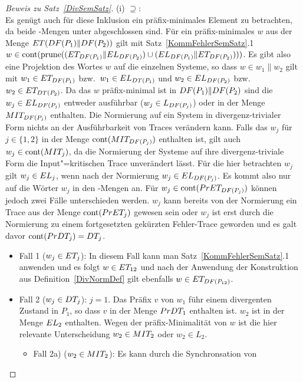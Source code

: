 \begin{proof}[Beweis zu Satz~\ref{DivSemSatz}]
  (i) \glqq $\supseteq$\grqq{}:\\
  Es genügt auch für diese Inklusion ein präfix-minimales Element zu
  betrachten, da beide \ET{}-Mengen unter \cont{} abgeschlossen sind. Für ein
  präfix-minimales $w$ aus der Menge $ET (DF (P_1)\|DF (P_2))$ gilt mit
  Satz~\ref{KommFehlerSemSatz}.1 $w\in \mathrm{cont} (\mathrm{prune} ((ET _{DF (P_1)}\|EL
  _{DF (P_2)})\cup (EL _{DF (P_1)}\|ET _{DF (P_2)})))$. Es gibt also
  eine Projektion des Wortes $w$ auf die einzelnen Systeme, so dass $w\in w_1\|
  w_2$ gilt mit $w_1\in ET _{DF (P_1)}$ bzw.\ $w_1\in EL _{DT (P_1)}$ und
  $w_2\in EL _{DF (P_2)}$ bzw.\ $w_2\in ET _{DT (P_2)}$. Da das $w$
  präfix-minimal ist in $DF (P_1)\|DF (P_2)$ sind die $w_j\in EL _{DF
  (P_j)}$ entweder ausführbar ($w_j\in L _{DF (P_j)}$) oder in der Menge $MIT
  _{DF (P_j)}$ enthalten. Die Normierung auf ein System in divergenz-trivialer
  Form nichts an der Ausführbarkeit von Traces verändern kann. Falls das $w_j$
  für $j\in\{1,2\}$ in der Menge $\mathrm{cont} (MIT _{DF (P_j)})$ enthalten ist,
  gilt auch $w_j\in\mathrm{cont} (MIT _j)$, da die Normierung der Systeme auf
  ihre divergenz-triviale Form die Input"=kritischen Trace unverändert lässt.
  Für die hier betrachten $w_j$ gilt $w_j\in EL _j$, wenn nach der Normierung
  $w_j\in EL _{DF (P_j)}$. Es kommt also nur auf die Wörter $w_j$ in den
  \ET{}-Mengen an. Für $w_j\in\mathrm{cont} (PrET _{DF (P_j)})$ können jedoch zwei
  Fälle unterschieden werden. $w_j$ kann bereits von der Normierung ein Trace
  aus der Menge $\mathrm{cont} (PrET _j)$ gewesen sein oder $w_j$ ist erst durch die
  Normierung zu einem fortgesetzten gekürzten Fehler-Trace geworden und es galt
  davor $\mathrm{cont} (PrDT _j) = DT _j$.
  \begin{itemize}
    \item Fall 1 ($w_j\in ET _j$): In diesem Fall kann man
      Satz~\ref{KommFehlerSemSatz}.1 anwenden und es folgt $w\in ET _{12}$ und
      nach der Anwendung der Konstruktion aus Definition~\ref{DivNormDef} gilt
      ebenfalls $w\in ET _{DF (P_{12})}$.
    \item Fall 2 ($w_j\in DT _j$): \OBdA{} $j=1$. Das Präfix $v$ von $w_1$ führ
      einem divergenten Zustand in $P_1$, so dass $v$ in der Menge $PrDT _1$
      enthalten ist. $w_2$ ist in der Menge $EL _2$ enthalten. Wegen der
      präfix-Minimalität von $w$ ist die hier relevante Unterscheidung
      $w_2\in MIT _2$ oder $w_2\in L_2$.
      \begin{itemize}
        \item Fall 2a) ($w_2\in MIT _2$): Es kann durch die Synchronsation von

\end{itemize}
\end{itemize}
\end{proof}
